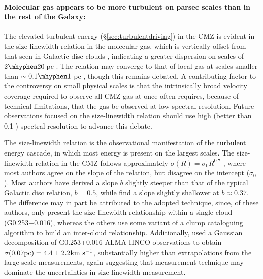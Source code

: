 \paragraph{Molecular gas appears to be more turbulent on parsec scales than in the rest of the Galaxy:}\label{sec:velocitystructure}
The elevated turbulent energy (\S \ref{sec:turbulentdriving}) in the CMZ is evident in the size-linewidth relation in the molecular gas, which is vertically offset from that seen in Galactic disc clouds \citep{Heyer2015}, indicating a greater dispersion on scales of $2\mhyphen20$\,pc \citep{Shetty2012}. 
The relation may converge to that of local gas at scales smaller than $\sim0.1\mhyphen1$ pc \citep{Kauffmann2017c}, though this remains debated.
A contributing factor to the controversy on small physical scales is that the intrinsically broad velocity coverage required to observe all CMZ gas at once often requires, because of technical limitations, that the gas be observed at low spectral resolution.
Future observations focused on the size-linewidth relation should use high (better than 0.1 \kms) spectral resolution to advance this debate.

The size-linewidth relation is the observational manifestation of the turbulent energy cascade, in which most energy is present on the largest scales.
The size-linewidth relation in the CMZ follows approximately  $\sigma(R) = \sigma_{0} R^{0.7}$ \citep{Shetty2012,Kauffmann2017c,Tanaka2020,Krieger2020}, where most authors agree on the slope of the relation, but disagree on the intercept ($\sigma_{0}$).
Most authors have derived a slope $b$ slightly steeper than that of the typical Galactic disc relation, $b=0.5$, while \citet{Henshaw2020} find a slope slightly shallower at $b\approx0.37$.  The difference may in part be attributed to the adopted technique, since, of these authors, only \citet{Henshaw2020} present the size-linewidth relationship within a single cloud (G0.253+0.016), whereas the others use some variant of a clump cataloguing algorithm to build an inter-cloud relationship.
Additionally, \citet{Henshaw2019} used a Gaussian decomposition of G0.253+0.016 ALMA HNCO observations to obtain $\sigma(0.07 \mathrm{pc}) = 4.4\pm2.2 \mbox{${\rm km}~{\rm s}^{-1}$}$, substantially higher than extrapolations from the large-scale measurements, again suggesting that measurement technique may dominate the uncertainties in size-linewidth measurement.

